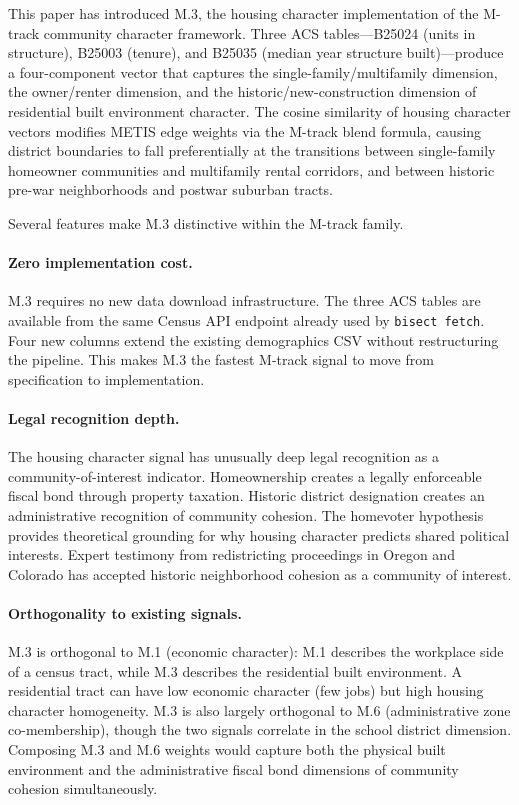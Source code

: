 \label{sec:conclusion}

This paper has introduced M.3, the housing character implementation of the
M-track community character framework.
Three ACS tables---B25024 (units in structure), B25003 (tenure), and B25035
(median year structure built)---produce a four-component vector that captures
the single-family/multifamily dimension, the owner/renter dimension, and
the historic/new-construction dimension of residential built environment
character.
The cosine similarity of housing character vectors modifies METIS edge weights
via the M-track blend formula, causing district boundaries to fall preferentially
at the transitions between single-family homeowner communities and multifamily
rental corridors, and between historic pre-war neighborhoods and postwar
suburban tracts.

Several features make M.3 distinctive within the M-track family.

\paragraph{Zero implementation cost.}
M.3 requires no new data download infrastructure.
The three ACS tables are available from the same Census API endpoint already
used by \texttt{bisect fetch}.
Four new columns extend the existing demographics CSV without restructuring
the pipeline.
This makes M.3 the fastest M-track signal to move from specification to
implementation.

\paragraph{Legal recognition depth.}
The housing character signal has unusually deep legal recognition as a
community-of-interest indicator.
Homeownership creates a legally enforceable fiscal bond through property
taxation.
Historic district designation creates an administrative recognition of
community cohesion.
The homevoter hypothesis~\citep{fischel2001} provides theoretical grounding
for why housing character predicts shared political interests.
Expert testimony from redistricting proceedings in Oregon and Colorado has
accepted historic neighborhood cohesion as a community of interest.

\paragraph{Orthogonality to existing signals.}
M.3 is orthogonal to M.1 (economic character): M.1 describes the workplace
side of a census tract, while M.3 describes the residential built environment.
A residential tract can have low economic character (few jobs) but high housing
character homogeneity.
M.3 is also largely orthogonal to M.6 (administrative zone co-membership),
though the two signals correlate in the school district dimension.
Composing M.3 and M.6 weights would capture both the physical built environment
and the administrative fiscal bond dimensions of community cohesion simultaneously.

